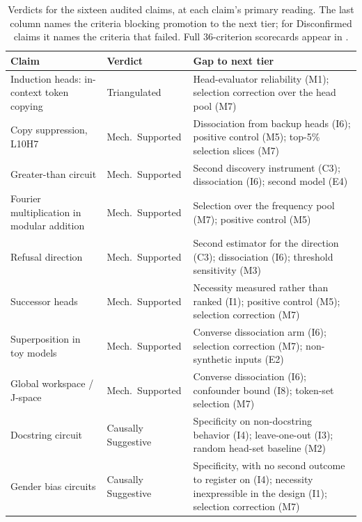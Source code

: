 \documentclass{article}
\newcommand{\tighttable}{\setlength{\tabcolsep}{4pt}\renewcommand{\arraystretch}{1.05}}
\begin{document}
\begingroup
{}
\begin{table}[tbp]
\centering
\scriptsize
\tighttable
\caption{Verdicts for the sixteen audited claims, at each claim's primary reading. The last column names the criteria blocking promotion to the next tier; for Disconfirmed claims it names the criteria that failed. Full 36-criterion scorecards appear in .}
\label{tab:verdict-summary}
\begin{tabular}{@{}>{\raggedright\arraybackslash}p{4.35cm}>{\raggedright\arraybackslash}p{2.6cm}>{\raggedright\arraybackslash}p{5.9cm}@{}}
\toprule
\textbf{Claim} & \textbf{Verdict} & \textbf{Gap to next tier} \\
\midrule
Induction heads: in-context token copying \citep{olsson2022context} & Triangulated & Head-evaluator reliability (M1); selection correction over the head pool (M7) \\
\midrule
Copy suppression, L10H7 \citep{mcdougall2023copy} & Mech.\ Supported & Dissociation from backup heads (I6); positive control (M5); top-5\% selection slices (M7) \\
Greater-than circuit \citep{hanna2023greater} & Mech.\ Supported & Second discovery instrument (C3); dissociation (I6); second model (E4) \\
Fourier multiplication in modular addition \citep{nanda2023progress} & Mech.\ Supported & Selection over the frequency pool (M7); positive control (M5) \\
Refusal direction \citep{arditi2024refusal} & Mech.\ Supported & Second estimator for the direction (C3); dissociation (I6); threshold sensitivity (M3) \\
Successor heads \citep{gould2023successor} & Mech.\ Supported & Necessity measured rather than ranked (I1); positive control (M5); selection correction (M7) \\
Superposition in toy models \citep{elhage2022superposition} & Mech.\ Supported & Converse dissociation arm (I6); selection correction (M7); non-synthetic inputs (E2) \\
Global workspace / J-space \citep{gurnee2026verbalizable} & Mech.\ Supported & Converse dissociation (I6); confounder bound (I8); token-set selection (M7) \\
\midrule
Docstring circuit \citep{heimersheim2023docstring} & Causally Suggestive & Specificity on non-docstring behavior (I4); leave-one-out (I3); random head-set baseline (M2) \\
Gender bias circuits \citep{vig2020gender} & Causally Suggestive & Specificity, with no second outcome to register on (I4); necessity inexpressible in the design (I1); selection correction (M7) \\

\end{tabular}
\end{table}
\end{document}
